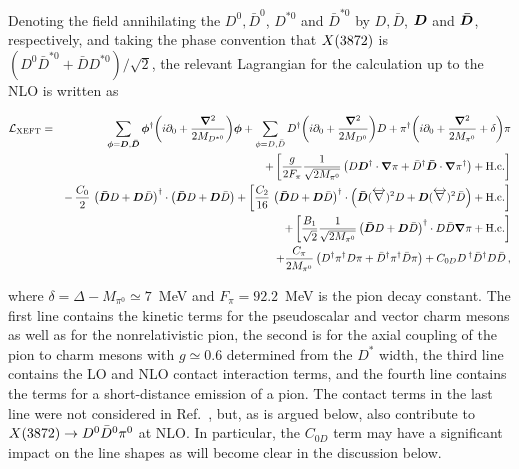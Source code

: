 Denoting the field annihilating the 
$D^0, \bar D^0$, $D^{*0}$ and $\bar D^{*0}$ by $D,\bar D$, $\bm{ D }$ and $\bm{ {\bar D } }$, 
respectively, and taking the phase 
convention that $X(3872)$ is $\left( D^0\bar D^{*0} +\bar D D^{*0} 
\right)/\sqrt{2}$, the relevant Lagrangian for the calculation up to the NLO is 
written as~\cite{Fleming:2007rp}
\begin{widetext}
\begin{eqnarray}
 {\cal L}_{\rm XEFT} 
  &=& 
 \sum_{\bm{\phi}=\bm{ D },\bm{ {\bar D } } } \bm{\phi}^{\dagger} \bigg(i\partial_0 + 
\frac{\bm{\nabla}^2}{2 M_{D^{*0}}
		    }\bigg)\bm{\phi} 
 +  \sum_{{\phi}=D,\bar D } D^\dagger \bigg(i\partial_0 + 
\frac{\bm{\nabla}^2}{2 M_{D^0} } \bigg) D 
 + \pi^\dagger \bigg(i\partial_0 + \frac{\bm{\nabla}^2}{2 M_{\pi^0}}
   + \delta\bigg) \pi
\nonumber \\
&&+ \left[  
\frac{g}{2 F_\pi} \frac{1}{\sqrt{ 2M_{\pi^0} } }
 \left( D \bm{ D }^\dagger \cdot \bm{\nabla}\pi  
   + \bar D^\dagger \bm{ {\bar D } } \cdot \bm{\nabla}\pi^\dagger \right) + {\rm
 H.c.} \right]
\nonumber \\
 && 
- \,  
\frac{C_0}{2} \, \left(\bm{ {\bar D } } D + \bm{ D } \bar D \right)^\dagger 
\cdot \left(\bm{ {\bar D } } D + \bm{ D } \bar D \right) 
+  \left[   \frac{C_2 }{16} \, 
\left(\bm{ {\bar D } } D + \bm{ D } \bar D \right)^\dagger 
\cdot \left(\bm{ {\bar D } } (\overleftrightarrow \nabla)^2 D 
        + \bm{ D } (\overleftrightarrow \nabla)^2 \bar D \right) + {\rm H.c.} \right]
\nonumber \\
&&+ \left[  \frac{B_1 }{\sqrt{2}}\frac{1}{\sqrt{2 M_{\pi^0}}} \left(\bm{ {\bar D } } D + 
\bm{ D } \bar D \right)^\dagger \cdot D \bar{D} \bm{\nabla} \pi + {\rm 
H.c.}\right] \nonumber\\
&& + \frac{C_\pi}{2 M_{\pi^0}} \left( D^\dagger \pi^\dagger D \pi + 
\bar D^\dagger 
\pi^\dagger \bar D \pi \right) + C_{0D} D\,^\dagger\bar{D}^\dagger D\bar D \,,
\label{eq:XEFTlag}
\end{eqnarray}
\end{widetext}
where $\delta=\Delta-M_{\pi^0}\simeq7$~MeV and
$F_\pi=92.2$~MeV is the pion decay constant. The first line 
contains the kinetic terms for the pseudoscalar and vector charm mesons as 
well as for the nonrelativistic pion, the second is for the axial coupling of 
the pion to charm mesons with $g\simeq0.6$ determined from the $D^{*}$ width, 
the third line contains the LO and NLO contact interaction terms, and the 
fourth line contains the terms for a  short-distance emission of a pion. The contact terms in 
the last line were not considered in Ref.~\cite{Fleming:2007rp}, but,
as is argued below, also contribute to $X(3872)\to D^0\bar D^0\pi^0$ at NLO. In 
particular, the $C_{0D}$ term may have a significant impact on the line shapes
as will become clear in the  discussion below.

